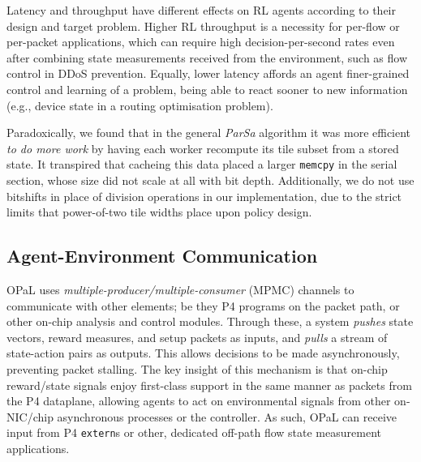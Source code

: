 \documentclass[
sigconf,natbib=false
,anonymous=true
,10pt
]{acmart}
\newcommand{\approachshort}{OPaL}
\begin{document}
Latency and throughput have different effects on RL agents according to their design and target problem.
Higher RL throughput is a necessity for per-flow or per-packet applications, which can require high decision-per-second rates even after combining state measurements received from the environment, such as flow control in DDoS prevention.
Equally, lower latency affords an agent finer-grained control and learning of a problem, being able to react sooner to new information (e.g., device state in a routing optimisation problem).

Paradoxically, we found that in the general \emph{ParSa} algorithm it was more efficient \emph{to do more work} by having each worker recompute its tile subset from a stored state.
It transpired that cacheing this data placed a larger \texttt{memcpy} in the serial section, whose size did not scale at all with bit depth.
Additionally, we do not use bitshifts in place of division operations in our implementation, due to the strict limits that power-of-two tile widths place upon policy design.

\subsection{Agent-Environment Communication}\label{sec:agent-environment-communication}
\approachshort{} uses \emph{multiple-producer/multiple-consumer} (MPMC) channels to communicate with other elements; be they P4 programs on the packet path, or other on-chip analysis and control modules.
Through these, a system \emph{pushes} state vectors, reward measures, and setup packets as inputs, and \emph{pulls} a stream of state-action pairs as outputs.
This allows decisions to be made asynchronously, preventing packet stalling.
The key insight of this mechanism is that on-chip reward/state signals enjoy first-class support in the same manner as packets from the P4 dataplane, allowing agents to act on environmental signals from other on-NIC/chip asynchronous processes or the controller.
As such, \approachshort{} can receive input from P4 \texttt{extern}s or other, dedicated off-path flow state measurement applications.
\end{document}
